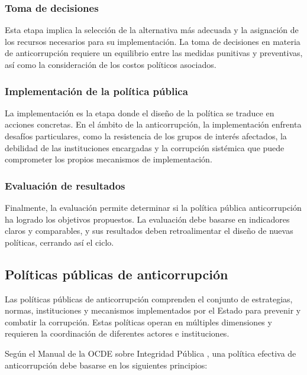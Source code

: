 \documentclass[12pt,a4paper]{article}
\begin{document}
\subsubsection{Toma de decisiones}

Esta etapa implica la selección de la alternativa más adecuada y la asignación de los recursos necesarios para su implementación. La toma de decisiones en materia de anticorrupción requiere un equilibrio entre las medidas punitivas y preventivas, así como la consideración de los costos políticos asociados.

\subsubsection{Implementación de la política pública}

La implementación es la etapa donde el diseño de la política se traduce en acciones concretas. En el ámbito de la anticorrupción, la implementación enfrenta desafíos particulares, como la resistencia de los grupos de interés afectados, la debilidad de las instituciones encargadas y la corrupción sistémica que puede comprometer los propios mecanismos de implementación.

\subsubsection{Evaluación de resultados}

Finalmente, la evaluación permite determinar si la política pública anticorrupción ha logrado los objetivos propuestos. La evaluación debe basarse en indicadores claros y comparables, y sus resultados deben retroalimentar el diseño de nuevas políticas, cerrando así el ciclo.

\subsection{Políticas públicas de anticorrupción}

Las políticas públicas de anticorrupción comprenden el conjunto de estrategias, normas, instituciones y mecanismos implementados por el Estado para prevenir y combatir la corrupción. Estas políticas operan en múltiples dimensiones y requieren la coordinación de diferentes actores e instituciones.

Según el Manual de la OCDE sobre Integridad Pública \parencite{ocde2020}, una política efectiva de anticorrupción debe basarse en los siguientes principios:
\end{document}

